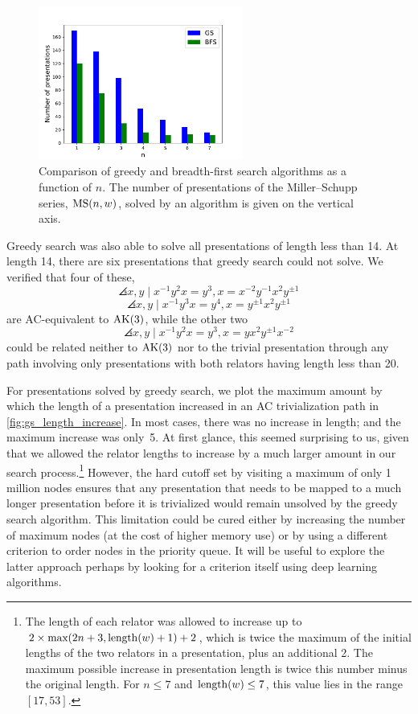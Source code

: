 \begin{figure}
	\centering
    \includegraphics[width=0.6\textwidth]{fig/performance_of_search_vs_n.pdf}
    \caption{Comparison of greedy and breadth-first search algorithms as a function of $n$.
    The number of presentations of the Miller--Schupp series, $\text{MS}(n, w)$, solved by an algorithm is given on the vertical axis.}
	\label{fig:performance_of_search_vs_n}
\end{figure}

Greedy search was also able to solve all presentations of length less than 14.
At length 14, there are six presentations that greedy search could not solve. We verified that four of these,
\[
\angles{x, y \mid x^{-1} y^2 x = y^{3} , x = x^{-2} y^{-1} x^2 y^{\pm 1}}
\]
\[
\angles{x, y \mid x^{-1} y^3 x = y^{4} , x = y^{\pm 1} x^2 y^{\pm 1}}
\]
are AC-equivalent to $\text{AK}(3)$, while the other two
\[
\angles{x, y \mid x^{-1} y^2 x = y^{3} , x = y x^2 y^{\pm 1} x^{-2}}
\]
could be related neither to $\text{AK}(3)$ nor to the trivial presentation through any path involving only presentations with both relators having length less than 20.

For presentations solved by greedy search, we plot the maximum amount by which the length of a presentation increased in an AC trivialization path in \cref{fig:gs_length_increase}.
In most cases, there was no increase in length; and the maximum increase was only~5.
At first glance, this seemed surprising to us, given that we allowed the relator lengths to increase by a much larger amount in our search process.\footnote{The length of each relator was allowed to increase up to \(2 \times \text{max}(2n+3, \operatorname{length}(w)+1) + 2\), which is twice the maximum of the initial lengths of the two relators in a presentation, plus an additional 2.
The maximum possible increase in presentation length is twice this number minus the original length.
For $n \leq 7$ and $\operatorname{length}(w) \leq 7$, this value lies in the range $[17, 53]$.}
However, the hard cutoff set by visiting a maximum of only 1 million nodes ensures that any presentation that needs to be mapped to a much longer presentation before it is trivialized would remain unsolved by the greedy search algorithm.
This limitation could be cured either by increasing the number of maximum nodes (at the cost of higher memory use) or by using a different criterion to order nodes in the priority queue.
It will be useful to explore the latter approach perhaps by looking for a criterion itself using deep learning algorithms.

